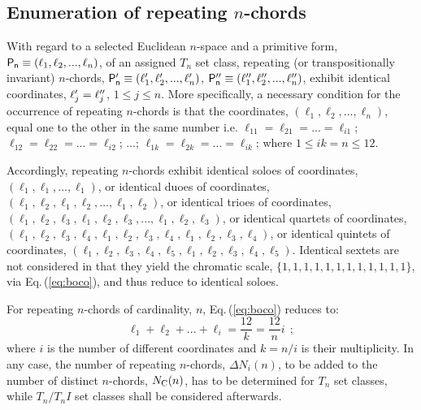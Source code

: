 \documentclass[12pt,a4paper]{article}
\begin{document}
\subsection{Enumeration of repeating $n$-chords}
\label{coco}

With regard to a selected Euclidean $n$-space and a primitive form,
${\sf P_n}\equiv(\ell_1,\ell_2,...,\ell_n)$, of an assigned $T_n$ set class,
repeating (or transpositionally invariant) $n$-chords,
${\sf P_n^\prime}\equiv(\ell_1^\prime,\ell_2^\prime,...,\ell_n^\prime)$,
${\sf P_n^{\prime\prime}}\equiv(\ell_1^{\prime\prime},\ell_2^{\prime\prime},...,\ell_n^{\prime\prime})$,
exhibit identical coordinates,
$\ell_j^\prime=\ell_j^{\prime\prime}$, $1\le j\le n$.   More specifically, a
necessary condition for the occurrence of repeating $n$-chords is that
the coordinates, $(\ell_1,\ell_2,...,\ell_n)$, equal one to the other in the
same number i.e. $\ell_{11}=\ell_{21}=...=\ell_{i1}$; $\ell_{12}=\ell_{22}=
...=\ell_{i2}$; ...; $\ell_{1k}=\ell_{2k}=...=\ell_{ik}$; where $1\le ik=n\le
12$.

Accordingly, repeating $n$-chords exhibit identical soloes of
coordinates, $(\ell_1,\ell_1,...,\ell_1)$, or identical duoes of coordinates,
$(\ell_1,\ell_2,\ell_1,\ell_2,...,\ell_1,\ell_2)$, or identical trioes of
coordinates, $(\ell_1,\ell_2,\ell_3,\ell_1,\ell_2,\ell_3,...,\ell_1,\ell_2,
\ell_3)$, or identical quartets of coordinates,
$(\ell_1,\ell_2,\ell_3,\ell_4,
\ell_1,\ell_2,\ell_3,\ell_4,\ell_1,\ell_2,\ell_3,\ell_4)$, or identical
quintets of coordinates, $(\ell_1,\ell_2,\ell_3,\ell_4,\ell_5,\ell_1,\ell_2,
\ell_3,\ell_4,\ell_5)$.   Identical
sextets are not considered in that they yield the chromatic scale,
$\{1,1,1,1,1,1,1,1,1,1,1,1\}$, via Eq.\,(\ref{eq:boco}), and thus reduce to
identical soloes.

For repeating $n$-chords of cardinality, $n$, Eq.\,(\ref{eq:boco}) reduces to:
\begin{equation}
\label{eq:bocr}
\ell_1+\ell_2+...+\ell_i=\frac{12}k=\frac{12}ni~~;
\end{equation}
where $i$ is the number of different coordinates and $k=n/i$ is their
multiplicity.   In any case, the number of repeating $n$-chords, $\Delta N_i(n)$,
to be added to the number of distinct $n$-chords, $N_{\rm C}(n)$, has to be
determined for $T_n$ set classes, while $T_n/T_nI$ set classes shall be
considered afterwards.
\end{document}

